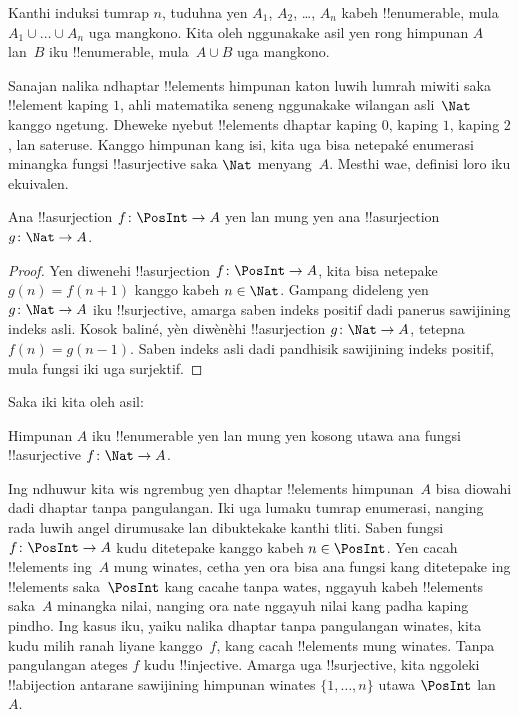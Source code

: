 \documentclass[../../../include/open-logic-section]{subfiles}
\begin{document}
\begin{prob}
  Kanthi induksi tumrap $n$, tuduhna yen $A_1$, $A_2$, \dots, $A_n$ kabeh
  !!{enumerable}, mula $A_1 \cup \dots \cup A_n$ uga mangkono. Kita oleh nggunakake
  asil yen rong himpunan $A$ lan~$B$ iku !!{enumerable}, mula~$A \cup
  B$ uga mangkono.
\end{prob}

Sanajan nalika ndhaptar !!{element}s himpunan katon luwih lumrah
miwiti saka !!{element} kaping $1$, ahli matematika seneng
nggunakake wilangan asli~$\Nat$ kanggo ngetung.
Dheweke nyebut !!{element}s dhaptar kaping $0$, kaping $1$, kaping $2$, lan sateruse.
Kanggo himpunan kang isi, kita uga bisa netepaké enumerasi minangka
fungsi !!a{surjective} saka $\Nat$ menyang~$A$.
Mesthi wae, definisi loro iku ekuivalen.

\begin{prop}
  Ana !!a{surjection} $f\colon \PosInt \to A$ yen lan mung yen ana
  !!a{surjection} $g\colon \Nat \to A$.
\end{prop}

\begin{proof}
  Yen diwenehi !!a{surjection} $f\colon \PosInt \to A$, kita bisa netepake $g(n) =
  f(n+1)$ kanggo kabeh $n \in \Nat$. Gampang dideleng yen $g\colon \Nat
  \to A$ iku !!{surjective}, amarga saben indeks positif dadi panerus
  sawijining indeks asli. Kosok baliné, yèn diwènèhi !!a{surjection} $g\colon
  \Nat \to A$, tetepna $f(n) = g(n-1)$. Saben indeks asli dadi
  pandhisik sawijining indeks positif, mula fungsi iki uga surjektif.
\end{proof}

Saka iki kita oleh asil:

\begin{cor}
Himpunan $A$ iku !!{enumerable} yen lan mung yen kosong utawa ana
fungsi !!a{surjective} $f\colon \Nat \to A$.
\end{cor}

Ing ndhuwur kita wis ngrembug yen dhaptar !!{element}s himpunan~$A$ bisa
diowahi dadi dhaptar tanpa pangulangan. Iki uga lumaku tumrap
enumerasi, nanging rada luwih angel dirumusake lan dibuktekake kanthi tliti.
Saben fungsi $f\colon \PosInt \to A$ kudu ditetepake kanggo kabeh $n \in
\PosInt$. Yen cacah !!{element}s ing~$A$ mung winates, cetha yen ora bisa
ana fungsi kang ditetepake ing !!{element}s saka~$\PosInt$ kang cacahe tanpa wates,
nggayuh kabeh !!{element}s saka~$A$ minangka nilai, nanging ora nate
nggayuh nilai kang padha kaping pindho. Ing kasus iku, yaiku
nalika dhaptar tanpa pangulangan winates, kita kudu milih ranah
liyane kanggo~$f$, kang cacah !!{element}s mung winates.
Tanpa pangulangan ateges $f$ kudu !!{injective}. Amarga uga
!!{surjective}, kita nggoleki !!a{bijection} antarane sawijining
himpunan winates $\{1, \dots, n\}$ utawa $\PosInt$ lan~$A$.
\end{document}
